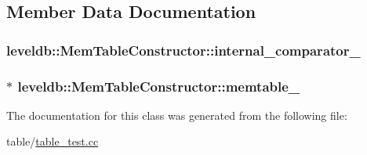\subsection{Member Data Documentation}
\hypertarget{classleveldb_1_1_mem_table_constructor_a77fb87fcc606b862e0aa997d97dd8275}{}
\subsubsection[{internal\+\_\+comparator\+\_\+}]{ leveldb\+::\+Mem\+Table\+Constructor\+::internal\+\_\+comparator\+\_\+\hspace{0.3cm}{\ttfamily [private]}}\label{classleveldb_1_1_mem_table_constructor_a77fb87fcc606b862e0aa997d97dd8275}
\hypertarget{classleveldb_1_1_mem_table_constructor_aee8e2d856ed9333890cce216b425edb8}{}
\subsubsection[{memtable\+\_\+}]{$\ast$ leveldb\+::\+Mem\+Table\+Constructor\+::memtable\+\_\+\hspace{0.3cm}{\ttfamily [private]}}\label{classleveldb_1_1_mem_table_constructor_aee8e2d856ed9333890cce216b425edb8}


The documentation for this class was generated from the following file\+:\begin{DoxyCompactItemize}
\item 
table/\hyperlink{table__test_8cc}{table\+\_\+test.\+cc}\end{DoxyCompactItemize}

